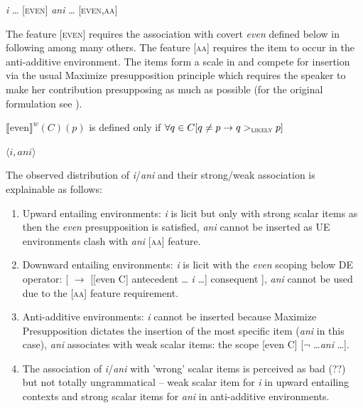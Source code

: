 \documentclass[output=paper,
]{langscibook}
\begin{document}
\ea \ea \textit{i} {\ldots} [\textsc{even}]
\ex  \textit{ani} {\ldots} [\textsc{even},\textsc{aa}]
\z
\z

\noindent The feature [\textsc{even}] requires the association with covert \textit{even} defined below in  following \cite{crnivc2014against} among many others. The feature [\textsc{aa}] requires the item to occur in the anti-additive environment. The items form a scale in  and compete for insertion via the usual Maximize presupposition principle which requires the speaker to make her contribution presupposing as much as possible (for the original formulation see \citealt{heim1991articles}).

\ea\label{ex-46} $\llbracket$even$\rrbracket^w (C)(p)$ is defined only if
$\forall q \in C[q \neq p \rightarrow q >_{\textsc{likely}} p]$
\z

\ea\label{ex-47} $\langle i,ani\rangle$
\z

\noindent The observed distribution of \textit{i}/\textit{ani} and their strong/weak association is explainable as follows:

\begin{enumerate}
	\item Upward entailing environments: \textit{i} is licit but only with strong scalar items as then the \textit{even} presupposition is satisfied, \textit{ani} cannot be inserted as UE environments clash with \textit{ani} [\textsc{aa}] feature.
	\item Downward entailing environments: \textit{i} is licit with the \textit{even} scoping below DE operator:  {[} $\rightarrow$ {[}{[}even C{]} antecedent \ldots{} \textit{i} \ldots ] consequent ], \textit{ani} cannot be used due to the [\textsc{aa}] feature requirement.
	\item Anti-additive environments: \textit{i} cannot be inserted because Maximize Presupposition dictates the insertion of the most specific item (\textit{ani} in this case), \textit{ani} associates with weak scalar items: the scope [even C] [$\neg$ \ldots  \textit{ani} \ldots].
	\item The association of \textit{i}/\textit{ani} with 'wrong' scalar items is perceived as bad (??) but not totally ungrammatical -- weak scalar item for \textit{i} in upward entailing contexts and strong scalar items for \textit{ani} in anti-additive environments.
\end{enumerate}
\end{document}
